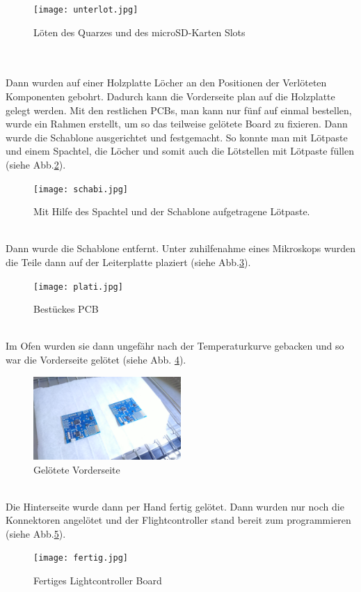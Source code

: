 \documentclass[12pt,a4paper, ngerman]{article}
\begin{document}
\begin{figure}[h]
\centering
\texttt{[image: unterlot.jpg]}
\caption[]{Löten des Quarzes und des microSD-Karten Slots}\label{unterlot}
\end{figure} \\ \\
Dann wurden auf einer Holzplatte Löcher an den Positionen der Verlöteten Komponenten gebohrt. Dadurch kann die Vorderseite plan auf die Holzplatte gelegt werden. Mit den restlichen PCBs, man kann nur fünf auf einmal bestellen, wurde ein Rahmen erstellt, um so das teilweise gelötete Board zu fixieren. Dann wurde die Schablone ausgerichtet und festgemacht. So konnte man mit Lötpaste und einem Spachtel, die Löcher und somit auch die Lötstellen mit Lötpaste füllen (siehe Abb.\ref{schabi}). 
\begin{figure}[h]
\centering
\texttt{[image: schabi.jpg]}
\caption[]{Mit Hilfe des Spachtel und der Schablone aufgetragene Lötpaste.}\label{schabi}
\end{figure} \\
Dann wurde die Schablone entfernt. Unter zuhilfenahme eines Mikroskops wurden die Teile dann auf der Leiterplatte plaziert (siehe Abb.\ref{plati}). 
\begin{figure}[h]
\centering
\texttt{[image: plati.jpg]}
\caption[]{Bestückes PCB}\label{plati}
\end{figure} \\
Im Ofen wurden sie dann ungefähr nach der Temperaturkurve gebacken und so war die Vorderseite gelötet (siehe Abb. \ref{vordi}). \\
\begin{figure}[h!]
\centering
\includegraphics[width=0.5\textwidth]{vordi.jpg}
\caption[]{Gelötete Vorderseite}\label{vordi}
\end{figure} \\ 
Die Hinterseite wurde dann per Hand fertig gelötet. Dann wurden nur noch die Konnektoren angelötet und der Flightcontroller stand bereit zum programmieren (siehe Abb.\ref{fertig}).
\begin{figure}[h!]
\centering
\texttt{[image: fertig.jpg]}
\caption[]{Fertiges Lightcontroller Board}\label{fertig}
\end{figure} \\
\newpage
\end{document}

